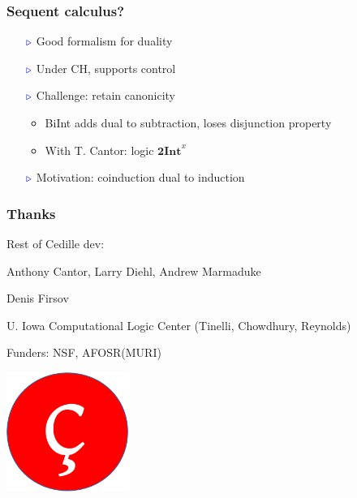 \documentclass[11pt]{beamer}
\newcommand{\myb}[0]{\ensuremath{\textcolor{blue}{\triangleright}}}
\begin{document}
\begin{frame}
  \frametitle{Sequent calculus?}

  \begin{itemize}
  \item[$\myb$] Good formalism for duality

\vspace{.2cm}

\item[$\myb$] Under CH, supports control

  \vspace{.2cm}

\item[$\myb$] Challenge: retain canonicity

  \begin{itemize}
  \item BiInt adds dual to subtraction, loses disjunction property
  \item With T. Cantor: logic $\textbf{2Int}^{x}$
  \end{itemize}

  \vspace{.2cm}

  \item[$\myb$] Motivation: coinduction dual to induction
\end{itemize}

\end{frame}





\begin{frame}
  \frametitle{Thanks}


  Rest of Cedille dev:
  
  \hspace{1cm} Anthony Cantor, Larry Diehl, Andrew Marmaduke

\vspace{1cm}

  Denis Firsov

\vspace{1cm}

  U. Iowa Computational Logic Center (Tinelli, Chowdhury, Reynolds)

\vspace{1cm}

  Funders: NSF, AFOSR(MURI)

\end{frame}


\begin{frame}
\begin{center}

\vspace{1cm}

\includegraphics[width=4cm]{logo}
\end{center}
\end{frame}
\end{document}
